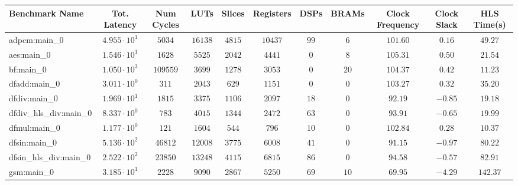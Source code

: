 \begin{tabular}{|l|c|c|c|c|c|c|c|c|c|c|}
\hline
Benchmark Name          & Tot. Latency           & Num Cycles & LUTs      & Slices    & Registers & DSPs    & BRAMs   & Clock Frequency & Clock Slack & HLS Time(s) \\
\hline
adpcm:main\_0           & $ 4.955 \cdot 10^{1} $ & $ 5034   $ & $ 16138 $ & $ 4815  $ & $ 10437 $ & $ 99  $ & $ 6   $ & $ 101.60      $ & $ 0.16    $ & $ 49.27   $ \\
aes:main\_0             & $ 1.546 \cdot 10^{1} $ & $ 1628   $ & $ 5525  $ & $ 2042  $ & $ 4441  $ & $ 0   $ & $ 8   $ & $ 105.31      $ & $ 0.50    $ & $ 21.54   $ \\
bf:main\_0              & $ 1.050 \cdot 10^{3} $ & $ 109559 $ & $ 3699  $ & $ 1278  $ & $ 3053  $ & $ 0   $ & $ 20  $ & $ 104.37      $ & $ 0.42    $ & $ 11.23   $ \\
dfadd:main\_0           & $ 3.011 \cdot 10^{0} $ & $ 311    $ & $ 2043  $ & $ 629   $ & $ 1151  $ & $ 0   $ & $ 0   $ & $ 103.27      $ & $ 0.32    $ & $ 35.20   $ \\
dfdiv:main\_0           & $ 1.969 \cdot 10^{1} $ & $ 1815   $ & $ 3375  $ & $ 1106  $ & $ 2097  $ & $ 18  $ & $ 0   $ & $ 92.19       $ & $ -0.85   $ & $ 19.18   $ \\
dfdiv\_hls\_div:main\_0 & $ 8.337 \cdot 10^{0} $ & $ 783    $ & $ 4015  $ & $ 1344  $ & $ 2472  $ & $ 63  $ & $ 0   $ & $ 93.91       $ & $ -0.65   $ & $ 19.99   $ \\
dfmul:main\_0           & $ 1.177 \cdot 10^{0} $ & $ 121    $ & $ 1604  $ & $ 544   $ & $ 796   $ & $ 10  $ & $ 0   $ & $ 102.84      $ & $ 0.28    $ & $ 10.37   $ \\
dfsin:main\_0           & $ 5.136 \cdot 10^{2} $ & $ 46812  $ & $ 12008 $ & $ 3775  $ & $ 6008  $ & $ 41  $ & $ 0   $ & $ 91.15       $ & $ -0.97   $ & $ 80.22   $ \\
dfsin\_hls\_div:main\_0 & $ 2.522 \cdot 10^{2} $ & $ 23850  $ & $ 13248 $ & $ 4115  $ & $ 6815  $ & $ 86  $ & $ 0   $ & $ 94.58       $ & $ -0.57   $ & $ 82.91   $ \\
gsm:main\_0             & $ 3.185 \cdot 10^{1} $ & $ 2228   $ & $ 9090  $ & $ 2867  $ & $ 5250  $ & $ 69  $ & $ 10  $ & $ 69.95       $ & $ -4.29   $ & $ 142.37  $ \\

\end{tabular}
